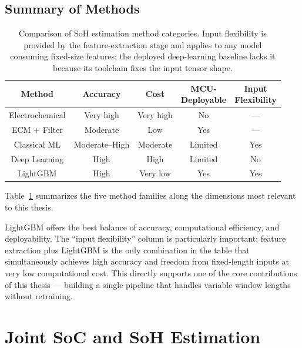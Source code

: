 \subsection{Summary of Methods}

\begin{table}[H]
    \centering
    \setcellgapes{3pt}
    \makegapedcells
    \begin{tabular}{c c c c c}
    \hline
    Method & Accuracy & Cost & \makecell{MCU- \\ Deployable} & \makecell{Input \\ Flexibility} \\
    \hline
    Electrochemical & Very high & Very high & No & --- \\
    ECM + Filter & Moderate & Low & Yes & --- \\
    Classical ML & Moderate--High & Moderate & Limited & Yes \\
    Deep Learning & High & High & Limited & No \\
    LightGBM & High & Very low & Yes & Yes \\
    \hline
    \end{tabular}
    \caption{Comparison of SoH estimation method categories. Input flexibility is provided by the feature-extraction stage and applies to any model consuming fixed-size features; the deployed deep-learning baseline lacks it because its toolchain fixes the input tensor shape.}
    \label{tab:soh_methods}
\end{table}



Table~\ref{tab:soh_methods} summarizes the five method families along the dimensions most relevant to this thesis.



LightGBM offers the best balance of accuracy, computational efficiency, and deployability. The ``input flexibility'' column is particularly important: feature extraction plus LightGBM is the only combination in the table that simultaneously achieves high accuracy and freedom from fixed-length inputs at very low computational cost. This directly supports one of the core contributions of this thesis --- building a single pipeline that handles variable window lengths without retraining.



\section{Joint SoC and SoH Estimation}
\label{sec:bg_joint}


